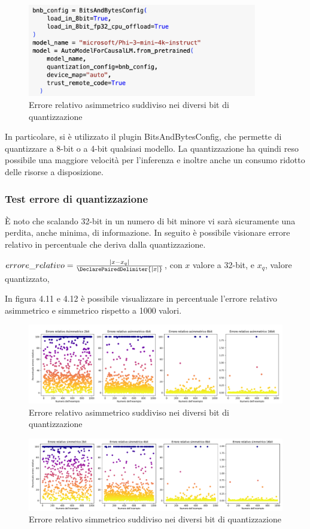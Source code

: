     \begin{figure}[htp]
    \centering
    \includegraphics[width=10cm]{img/bitsAndBytes.pdf}
    \caption{Errore relativo asimmetrico suddiviso nei diversi bit di quantizzazione}
    \end{figure}
    In particolare, si è utilizzato il plugin BitsAndBytesConfig, che permette di quantizzare a 8-bit o a 4-bit qualsiasi modello.
    La quantizzazione ha quindi reso possibile una maggiore velocità per l'inferenza e inoltre anche un consumo ridotto delle risorse a disposizione.

    \subsubsection{Test errore di quantizzazione}
     È noto che scalando 32-bit in un numero di bit minore vi sarà sicuramente una perdita, anche minima, di informazione. In seguito è possibile visionare errore relativo in percentuale che deriva dalla quantizzazione.\\
     \centerline{$errore\_relativo = \frac{|x - x_q|}{\DeclarePairedDelimiter{|x|}}$, con $x$ valore a 32-bit, e $x_q$, valore quantizzato,}
     In figura 4.11 e 4.12 è possibile visualizzare in percentuale l'errore relativo asimmetrico e simmetrico rispetto a 1000 valori.
    \begin{figure}[!h]
        \centering        
        \includegraphics[width=14.5cm]{img/totA.pdf}
        \caption{Errore relativo asimmetrico suddiviso nei diversi bit di quantizzazione}
    \end{figure}\newline
    \begin{figure}[!h]
        \centering        
        \includegraphics[width=14.5cm]{img/totS.pdf}
        \caption{Errore relativo simmetrico suddiviso nei diversi bit di quantizzazione}
    \end{figure}    
    \newline

